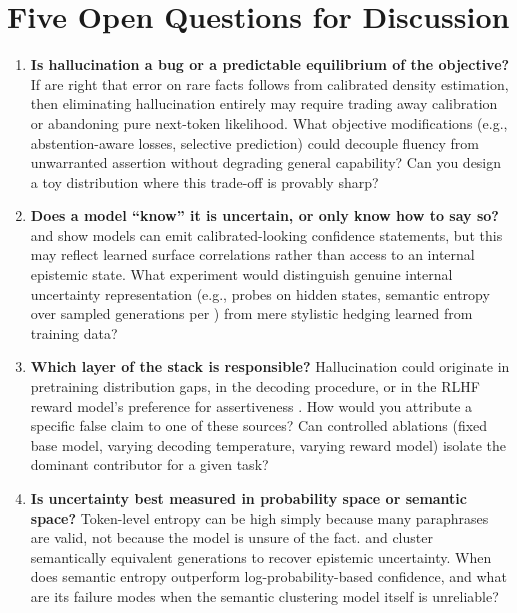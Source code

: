 \documentclass[11pt]{article}
\begin{document}
\section*{Five Open Questions for Discussion}

\begin{enumerate}[leftmargin=*,label=\textbf{Q\arabic*.}]

  \item \textbf{Is hallucination a bug or a predictable equilibrium of the
  objective?} If \citet{kalai2024calibrated} are right that error on rare facts
  follows from calibrated density estimation, then eliminating hallucination
  entirely may require trading away calibration or abandoning pure
  next-token likelihood. What objective modifications (e.g., abstention-aware
  losses, selective prediction) could decouple fluency from unwarranted
  assertion without degrading general capability? Can you design a toy
  distribution where this trade-off is provably sharp?

  \item \textbf{Does a model ``know'' it is uncertain, or only know how to
  say so?} \citet{kadavath2022know} and \citet{lin2022teaching} show models
  can emit calibrated-looking confidence statements, but this may reflect
  learned surface correlations rather than access to an internal epistemic
  state. What experiment would distinguish genuine internal uncertainty
  representation (e.g., probes on hidden states, semantic entropy over
  sampled generations per \citet{kuhn2023semantic}) from mere stylistic
  hedging learned from training data?

  \item \textbf{Which layer of the stack is responsible?} Hallucination could
  originate in pretraining distribution gaps, in the decoding procedure, or in
  the RLHF reward model's preference for assertiveness \citep{ouyang2022training}.
  How would you attribute a specific false claim to one of these sources? Can
  controlled ablations (fixed base model, varying decoding temperature,
  varying reward model) isolate the dominant contributor for a given task?

  \item \textbf{Is uncertainty best measured in probability space or semantic
  space?} Token-level entropy can be high simply because many paraphrases are
  valid, not because the model is unsure of the fact. \citet{farquhar2024detecting}
  and \citet{kuhn2023semantic} cluster semantically equivalent generations to
  recover epistemic uncertainty. When does semantic entropy outperform
  log-probability-based confidence, and what are its failure modes when the
  semantic clustering model itself is unreliable?


\end{enumerate}
\end{document}
